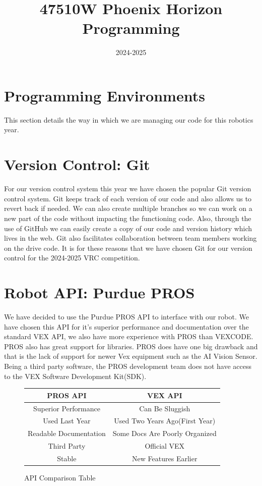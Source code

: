 \documentclass[12pt]{article}
\title{47510W Phoenix Horizon Programming}
\date{2024-2025}
\author{}
\begin{document}
 \maketitle
 \tableofcontents
 \newpage

\section*{Programming Environments}
This section details the way in which we are managing our code for this robotics year.
\section{Version Control: Git}
For our version control system this year we have chosen the popular Git version control system. Git keeps track of each version of our code and also allows us to revert back if needed. We can also create multiple branches so we can work on a new part of the code without impacting the functioning code. Also, through the use of GitHub we can easily create a copy of our code and version history which lives in the web. Git also facilitates collaboration between team members working on the drive code. It is for these reasons that we have chosen Git for our version control for the 2024-2025 VRC competition.
\section{Robot API: Purdue PROS}
We have decided to use the Purdue PROS API to interface with our robot. We have chosen this API for it's superior performance and documentation over the standard VEX API, we also have more experience with PROS than VEXCODE. PROS also has great support for libraries. PROS does have one big drawback and that is the lack of support for newer Vex equipment such as the AI Vision Sensor. Being a third party software, the PROS development team does not have access to the VEX Software Development Kit(SDK).
\begin{figure}[h]
        \caption{API Comparison Table}
        \label{TABLE::API_COMP}
        \centering
        \begin{tabular}{c|c}
        PROS API & VEX API \\
        \hline
        Superior Performance & Can Be Sluggish \\
        Used Last Year & Used Two Years Ago(First Year) \\
        Readable Documentation & Some Docs Are Poorly Organized \\
        Third Party & Official VEX \\
        Stable & New Features Earlier \\
    \end{tabular}
\end{figure}
\end{document}
